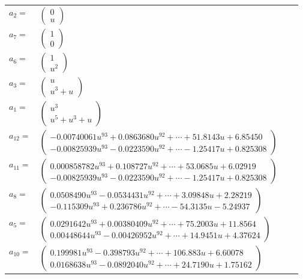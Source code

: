 \documentclass[1p]{elsarticle_modified}
\theoremstyle{definition}
\begin{document}
\begin{tabular}{m{7pt} m{180pt} m{7pt} m{180pt} }
\flushright $a_{2}=$&$\begin{pmatrix}0\\u\end{pmatrix}$ \\
\flushright $a_{7}=$&$\begin{pmatrix}1\\0\end{pmatrix}$ \\
\flushright $a_{6}=$&$\begin{pmatrix}1\\u^2\end{pmatrix}$ \\
\flushright $a_{3}=$&$\begin{pmatrix}u\\u^3+u\end{pmatrix}$ \\
\flushright $a_{1}=$&$\begin{pmatrix}u^3\\u^5+u^3+u\end{pmatrix}$ \\
\flushright $a_{12}=$&$\begin{pmatrix}-0.00740061 u^{93}+0.0863680 u^{92}+\cdots+51.8143 u+6.85450\\-0.00825939 u^{93}-0.0223590 u^{92}+\cdots-1.25417 u+0.825308\end{pmatrix}$ \\
\flushright $a_{11}=$&$\begin{pmatrix}0.000858782 u^{93}+0.108727 u^{92}+\cdots+53.0685 u+6.02919\\-0.00825939 u^{93}-0.0223590 u^{92}+\cdots-1.25417 u+0.825308\end{pmatrix}$ \\
\flushright $a_{8}=$&$\begin{pmatrix}0.0508490 u^{93}-0.0534431 u^{92}+\cdots+3.09848 u+2.28219\\-0.115309 u^{93}+0.236786 u^{92}+\cdots-54.3135 u-5.24937\end{pmatrix}$ \\
\flushright $a_{5}=$&$\begin{pmatrix}0.0291642 u^{93}+0.00380409 u^{92}+\cdots+75.2003 u+11.8564\\0.00448644 u^{93}-0.00426952 u^{92}+\cdots+14.9451 u+4.37624\end{pmatrix}$ \\
\flushright $a_{10}=$&$\begin{pmatrix}0.199981 u^{93}-0.398793 u^{92}+\cdots+106.883 u+6.60078\\0.0168638 u^{93}-0.0892040 u^{92}+\cdots+24.7190 u+1.75162\end{pmatrix}$ \\

\end{tabular}
\end{document}
